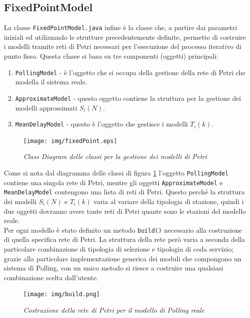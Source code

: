 \documentclass[12pt,a4paper,italian]{article}
\begin{document}
\subsection{FixedPointModel}
La classe \texttt{FixedPointModel.java} infine è la classe che, a partire dai parametri iniziali ed utilizzando le strutture precedentemente definite, permette di costruire i modelli tramite reti di Petri necessari per l'esecuzione del processo iterativo di punto fisso.
Questa classe si basa su tre componenti (oggetti) principali:
\begin{enumerate}
	\item \texttt{PollingModel} - è l'oggetto che si occupa della gestione della rete di Petri che modella il sistema reale.
	\item \texttt{ApproximateModel} - questo oggetto contiene la struttura per la gestione dei modelli approssimati $S_i(N)$.
	\item \texttt{MeanDelayModel} - questo è l'oggetto che gestisce i modelli $T_i(k)$.
\end{enumerate}
\begin{figure}[ht!]
	\centering
	\texttt{[image: img/fixedPoint.eps]}
	\caption{\emph{Class Diagram delle classi per la gestione dei modelli di Petri }}
	\label{fixedPoint_cd}
\end{figure}
Come si nota dal diagramma delle classi di figura \ref{fixedPoint_cd} l'oggetto \texttt{PollingModel} contiene una singola rete di Petri, mentre gli oggetti \texttt{ApproximateModel} e \texttt{MeanDelayModel} contengono una lista di reti di Petri. Questo perché la struttura dei modelli $S_i(N)$ e $T_i(k)$ varia al variare della tipologia di stazione, quindi i due oggetti dovranno avere tante reti di Petri quante sono le stazioni del modello reale.\\
Per ogni modello è stato definito un metodo \texttt{build()} necessario alla costruzione di quella specifica rete di Petri. La struttura della rete però varia a seconda della particolare combinazione di tipologia di selezione e tipologia di coda servizio; grazie alla particolare implementazione generica dei moduli che compongono un sistema di Polling, con un unico metodo si riesce a costruire una qualsiasi combinazione scelta dall'utente.\\
\begin{figure}[ht!]
	\centering
	\texttt{[image: img/build.png]}
	\caption{\emph{Costruzione della rete di Petri per il modello di Polling reale}}\label{build}
\end{figure}\\
\end{document}
